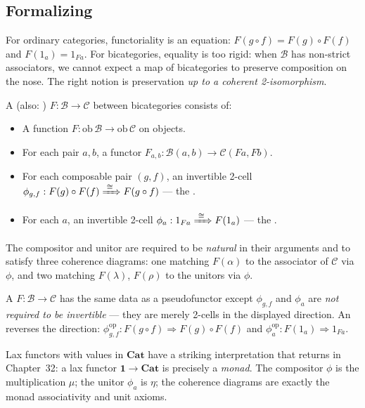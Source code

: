 \subsection{Formalizing}

For ordinary categories, functoriality is an equation: $F(g \circ f) = F(g)
\circ F(f)$ and $F(1_a) = 1_{Fa}$. For bicategories, equality is too rigid:
when $\mathcal{B}$ has non-strict associators, we cannot expect a map of
bicategories to preserve composition on the nose. The right notion is
preservation \emph{up to a coherent 2-isomorphism}.

\begin{definition}[Pseudofunctor]
\label{def:pseudofunctor}
A  (also: ) $F : \mathcal{B} \to
\mathcal{C}$ between bicategories consists of:
\begin{itemize}
  \item A function $F : \mathrm{ob}\,\mathcal{B} \to \mathrm{ob}\,\mathcal{C}$
        on objects.
  \item For each pair $a, b$, a functor $F_{a,b} : \mathcal{B}(a,b) \to
        \mathcal{C}(Fa, Fb)$.
  \item For each composable pair $(g, f)$, an invertible 2-cell
        $\phi_{g,f} : F(g) \circ F(f) \xRightarrow{\;\cong\;} F(g \circ f)$ —
        the .
  \item For each $a$, an invertible 2-cell $\phi_a : 1_{Fa} \xRightarrow{\;\cong\;}
        F(1_a)$ — the .
\end{itemize}
The compositor and unitor are required to be \emph{natural} in their arguments
and to satisfy three coherence diagrams: one matching $F(\alpha)$ to the
associator of $\mathcal{C}$ via $\phi$, and two matching $F(\lambda)$,
$F(\rho)$ to the unitors via $\phi$.
\end{definition}

\begin{definition}
A  $F : \mathcal{B} \to \mathcal{C}$ has the same data as a
pseudofunctor except $\phi_{g,f}$ and $\phi_a$ are \emph{not required to be
invertible} — they are merely 2-cells in the displayed direction. An
 reverses the direction: $\phi_{g,f}^{\mathrm{op}} :
F(g \circ f) \Rightarrow F(g) \circ F(f)$ and $\phi_a^{\mathrm{op}} : F(1_a)
\Rightarrow 1_{Fa}$.
\end{definition}

\begin{remark}
Lax functors with values in $\mathbf{Cat}$ have a striking interpretation
that returns in Chapter~32: a lax functor $\mathbf{1} \to \mathbf{Cat}$ is
precisely a \emph{monad}. The compositor $\phi$ is the multiplication
$\mu$; the unitor $\phi_a$ is $\eta$; the coherence diagrams are exactly
the monad associativity and unit axioms.
\end{remark}

